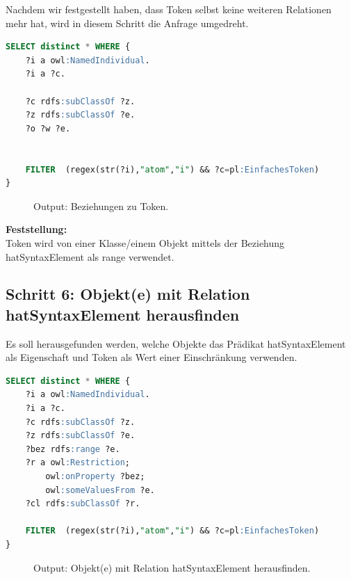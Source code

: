 Nachdem wir festgestellt haben, dass Token selbst keine weiteren Relationen mehr hat, wird in diesem Schritt die Anfrage umgedreht.


\begin{lstlisting}[caption={Beziehungen zu Token},captionpos=b,language=SQL]
SELECT distinct * WHERE { 
	?i a owl:NamedIndividual.
	?i a ?c.

	?c rdfs:subClassOf ?z.
	?z rdfs:subClassOf ?e.
	?o ?w ?e.


	FILTER  (regex(str(?i),"atom","i") && ?c=pl:EinfachesToken)
}
\end{lstlisting}

\begin{figure}[H]
\centering {}
\caption{Output: Beziehungen zu Token.\label{fig:atom_5}\protect\footnotemark}
\end{figure}

\textbf{Feststellung:}\\  Token wird von einer Klasse/einem Objekt mittels der Beziehung hatSyntaxElement als range verwendet.



\subsection{Schritt 6: Objekt(e) mit Relation hatSyntaxElement herausfinden}
\label{ssec:anh_beispiel_f_6}

Es soll herausgefunden werden, welche Objekte das Prädikat hatSyntaxElement als Eigenschaft und Token als Wert einer Einschränkung verwenden.


\begin{lstlisting}[caption={Objekt(e) mit Relation hatSyntaxElement herausfinden},captionpos=b,language=SQL]
SELECT distinct * WHERE { 
	?i a owl:NamedIndividual.
	?i a ?c.
	?c rdfs:subClassOf ?z.
	?z rdfs:subClassOf ?e.
	?bez rdfs:range ?e.
	?r a owl:Restriction;
		owl:onProperty ?bez;
		owl:someValuesFrom ?e.
	?cl rdfs:subClassOf ?r.

	FILTER  (regex(str(?i),"atom","i") && ?c=pl:EinfachesToken)
}
\end{lstlisting}

\begin{figure}[H]
\centering {}
\caption{Output: Objekt(e) mit Relation hatSyntaxElement herausfinden.\label{fig:atom_6}\protect\footnotemark}
\end{figure}

